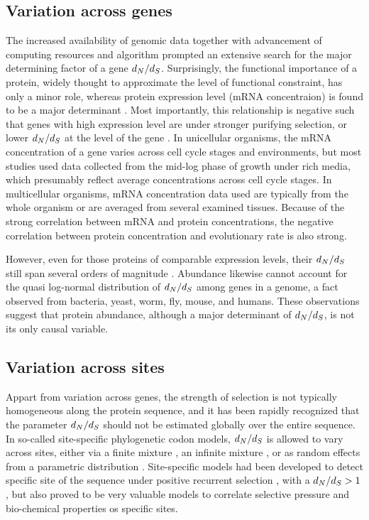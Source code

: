 \subsection{Variation across genes}

The increased availability of genomic data together with advancement of computing resources and algorithm prompted an extensive search for the major determining factor of a gene $d_N / d_S$.
Surprisingly, the functional importance of a protein, widely thought to approximate the level of functional constraint, has only a minor role, whereas protein expression level (mRNA concentraion) is found to be a major determinant \citep{Zhang2015}.
Most importantly, this relationship is negative such that genes with high expression level are under stronger purifying selection, or lower $d_N / d_S$ at the level of the gene \citep{Duret2000, Drummond2005a, Zhang2015}.
In unicellular organisms, the mRNA concentration of a gene varies across cell cycle stages and environments, but most studies used data collected from the mid-log phase of growth under rich media, which presumably reflect average concentrations across cell cycle stages.
In multicellular organisms, mRNA concentration data used are typically from the whole organism or are averaged from several examined tissues.
Because of the strong correlation between mRNA and protein concentrations, the negative correlation between protein concentration and evolutionary rate is also strong.

However, even for those proteins of comparable expression levels, their $d_N / d_S$ still span several orders of magnitude \citep{Drummond2008}.
Abundance likewise cannot account for the quasi log-normal distribution of $d_N / d_S$ among genes in a genome, a fact observed from bacteria, yeast, worm, fly, mouse, and humans.
These observations suggest that protein abundance, although a major determinant of $d_N / d_S$, is not its only causal variable.

\subsection{Variation across sites}

Appart from variation across genes, the strength of selection is not typically homogeneous along the protein sequence, and it has been rapidly recognized that the parameter $d_N / d_S$ should not be estimated globally over the entire sequence.
In so-called site-specific phylogenetic codon models, $d_N / d_S$ is allowed to vary across sites, either via a finite mixture \citep{Yang2001}, an infinite mixture \citep{Huelsenbeck2006}, or as random effects from a parametric distribution \citep{Lartillot2013}.
Site-specific models had been developed to detect specific site of the sequence under positive recurrent selection \citep{kosiol_patterns_2008}, with a $d_N / d_S>1$, but also proved to be very valuable models to correlate selective pressure and bio-chemical properties os specific sites.

